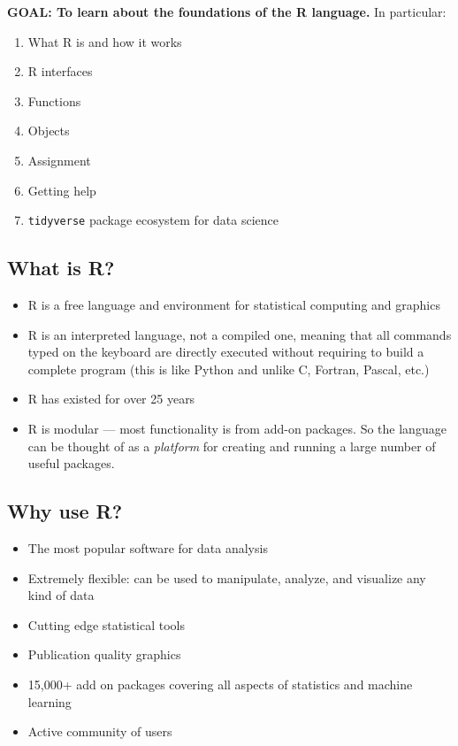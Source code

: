 \documentclass[]{book}
\providecommand{\tightlist}{%
  \setlength{\itemsep}{0pt}\setlength{\parskip}{0pt}}
\begin{document}
\textbf{GOAL: To learn about the foundations of the R language.} In particular:

\begin{enumerate}
\def\labelenumi{\arabic{enumi}.}
\tightlist
\item
  What R is and how it works
\item
  R interfaces
\item
  Functions
\item
  Objects
\item
  Assignment
\item
  Getting help
\item
  \texttt{tidyverse} package ecosystem for data science
\end{enumerate}

\hypertarget{what-is-r}{%
\subsection{What is R?}\label{what-is-r}}

\begin{itemize}
\tightlist
\item
  R is a free language and environment for statistical computing and graphics
\item
  R is an interpreted language, not a compiled one, meaning that all commands
  typed on the keyboard are directly executed without requiring to build a complete
  program (this is like Python and unlike C, Fortran, Pascal, etc.)
\item
  R has existed for over 25 years
\item
  R is modular --- most functionality is from add-on packages. So the language can
  be thought of as a \emph{platform} for creating and running a large number of useful packages.
\end{itemize}

\hypertarget{why-use-r}{%
\subsection{Why use R?}\label{why-use-r}}

\begin{itemize}
\tightlist
\item
  The most popular software for data analysis
\item
  Extremely flexible: can be used to manipulate, analyze, and visualize
  any kind of data
\item
  Cutting edge statistical tools
\item
  Publication quality graphics
\item
  15,000+ add on packages covering all aspects of statistics and machine learning
\item
  Active community of users
\end{itemize}
\end{document}
